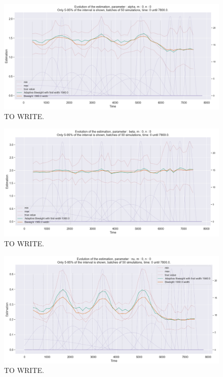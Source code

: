 \begin{figure}
\centering
\includegraphics[width = 0.90 \textwidth]{../imag/chap3/4/M.png}
\caption{TO WRITE.}
\label{fig:first_estimate_4_alpha}
\end{figure}

\begin{figure}
\centering
\includegraphics[width = 0.90 \textwidth]{../imag/chap3/4/N.png}
\caption{TO WRITE.}
\label{fig:first_estimate_4_beta}
\end{figure}

\begin{figure}
\centering
\includegraphics[width = 0.90 \textwidth]{../imag/chap3/4/O.png}
\caption{TO WRITE.}
\label{fig:first_estimate_4_nu}
\end{figure}






































